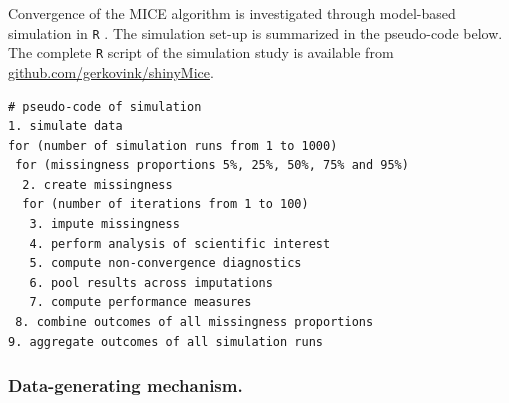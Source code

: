 \documentclass[Royal,times,sageh]{sagej}
\begin{document}
Convergence of the MICE algorithm is investigated through model-based
simulation in \texttt{R} \citep[version 3.6.3;][]{R}. The simulation
set-up is summarized in the pseudo-code below. The complete \texttt{R}
script of the simulation study is available from
\href{https://github.com/gerkovink/shinyMice/tree/master/3.Thesis/1.SimulationStudy}{github.com/gerkovink/shinyMice}.

\begin{verbatim}
# pseudo-code of simulation 
1. simulate data 
for (number of simulation runs from 1 to 1000)
 for (missingness proportions 5%, 25%, 50%, 75% and 95%)
  2. create missingness
  for (number of iterations from 1 to 100)
   3. impute missingness
   4. perform analysis of scientific interest
   5. compute non-convergence diagnostics 
   6. pool results across imputations
   7. compute performance measures
 8. combine outcomes of all missingness proportions
9. aggregate outcomes of all simulation runs 
\end{verbatim}

\hypertarget{data-generating-mechanism.}{%
\subsubsection{Data-generating
mechanism.}\label{data-generating-mechanism.}}
\end{document}
